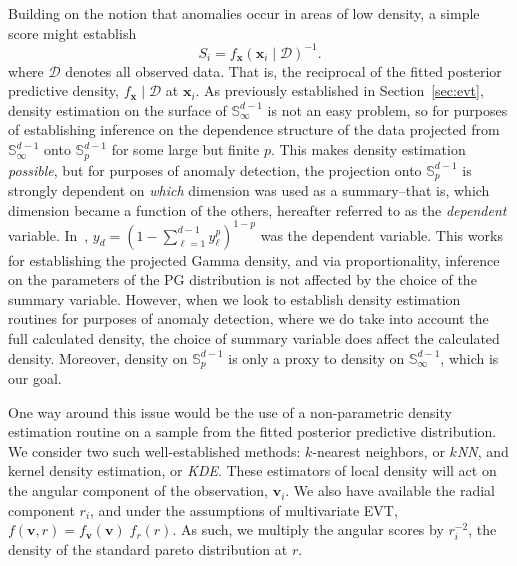 Building on the notion that anomalies occur in areas of low density, a simple
    score might establish
    \[
        S_i = f_{\bm{x}}(\bm{x}_i\mid \mathcal{D})^{-1}.  
    \]  
    where $\mathcal{D}$ denotes all observed data.  That is, the reciprocal of 
    the fitted posterior predictive density, $f_{\bm{x}}\mid \mathcal{D}$ at 
    $\bm{x}_i$.  As previously established in Section~\ref{sec:evt}, density 
    estimation on the surface of ${\mathbb S}_{\infty}^{d-1}$ is not an easy 
    problem, so for purposes of establishing inference on the dependence 
    structure of the data projected from ${\mathbb S}_{\infty}^{d-1}$ onto 
    ${\mathbb S}_p^{d-1}$ for some large but finite $p$.  This makes density 
    estimation \emph{possible}, but for purposes of anomaly detection, the 
    projection onto ${\mathbb S}_p^{d-1}$ is strongly dependent on \emph{which} 
    dimension was used as a summary--that is, which dimension became a function 
    of the others, hereafter referred to as the \emph{dependent} variable. 
    In~\cite{trubey:pg}, $y_d = (1 - \sum_{\ell = 1}^{d-1}y_{\ell}^p)^{1-p}$ 
    was the dependent variable.  This works for establishing the projected Gamma 
    density, and via proportionality, inference on the parameters of the PG 
    distribution is not affected by the choice of the summary variable. However, 
    when we look to establish density estimation routines for purposes of 
    anomaly detection, where we do take into account the full calculated 
    density, the 
    choice of summary variable does affect the calculated density.  Moreover, 
    density on $\mathbb{S}_p^{d-1}$ is only a proxy to density on 
    $\mathbb{S}_{\infty}^{d-1}$, which is our goal.


One way around this issue would be the use of a non-parametric density 
  estimation routine on a sample from the fitted posterior predictive 
  distribution.  We consider two such well-established methods: $k$-nearest 
  neighbors, or \emph{$k$NN}, and kernel density estimation, or \emph{KDE}.
  These estimators of local density will act on the angular component of the 
  observation, $\bm{v}_i$.  We also have available the radial component $r_i$, 
  and under the assumptions of multivariate EVT, 
  $f(\bm{v},r) = f_{\bm{v}}(\bm{v})\;f_{r}(r)$.  As such, we multiply the 
  angular scores by $r_i^{-2}$, the density of the standard pareto distribution 
  at $r$.

